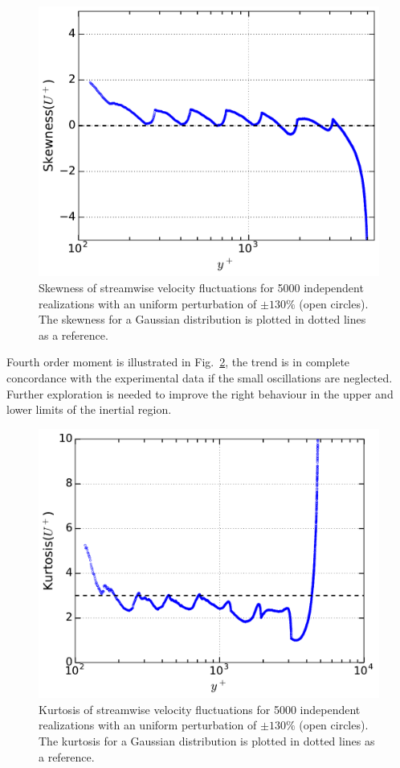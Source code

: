 \documentclass[aps,reprint,amsmath,amssymb,pra]{revtex4-1}%
\begin{document}
\begin{figure}[tb]
\includegraphics[scale=0.46]{figures/skewness_5000_assembles_un130}
\caption{\label{fig:skewun130} Skewness of streamwise velocity fluctuations for 5000 independent realizations with an uniform perturbation of $\pm 130\%$ (open circles). The skewness for a Gaussian distribution is plotted in dotted lines as a reference.}
\end{figure}
Fourth order moment is illustrated in Fig.~\ref{fig:kurtun130}, the trend is in complete concordance with the experimental data if the small oscillations are neglected. Further exploration is needed to improve the right behaviour in the upper and lower limits of the inertial region.
\begin{figure}[tbh] 
\includegraphics[scale=0.46]{figures/kurtosis_5000_assembles_un130}
\caption{\label{fig:kurtun130} Kurtosis of streamwise velocity fluctuations for 5000 independent realizations with an uniform perturbation of $\pm 130\%$ (open circles). The kurtosis for a Gaussian distribution is plotted in dotted lines as a reference.} 
\end{figure}
\end{document}
